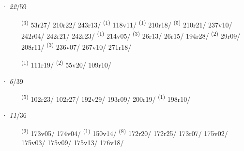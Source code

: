 \noindent{} · \textit{22}/59 \LEMMALINE
\begin{description}
    \item[]  \textsuperscript{(3)} \mbox{53r27/} \mbox{210r22/} \mbox{243r13/} \textsuperscript{(1)} \mbox{118v11/} \textsuperscript{(1)} \mbox{210r18/} \textsuperscript{(5)} \mbox{210r21/} \mbox{237v10/} \mbox{242r04/} \mbox{242r21/} \mbox{242r23/} \textsuperscript{(1)} \mbox{214v05/} \CASEBREAK {} \textsuperscript{(3)} \mbox{26r13/} \mbox{26r15/} \mbox{194r28/} \textsuperscript{(2)} \mbox{29r09/} \mbox{208r11/} \textsuperscript{(3)} \mbox{236v07/} \mbox{267v10/} \mbox{271r18/}
    \item[]  \textsuperscript{(1)} \mbox{111r19/} \CASEBREAK {} \textsuperscript{(2)} \mbox{55v20/} \mbox{109r10/}
\end{description}
\ENTRYEND
\noindent{} · \textit{6}/39 \LEMMALINE
\begin{description}
    \item[]  \textsuperscript{(5)} \mbox{102r23/} \mbox{102r27/} \mbox{192v29/} \mbox{193r09/} \mbox{200r19/} \textsuperscript{(1)} \mbox{198r10/}
\end{description}
\ENTRYEND
\noindent{} · \textit{11}/36 \LEMMALINE
\begin{description}
    \item[]  \textsuperscript{(2)} \mbox{173v05/} \mbox{174v04/} \CASEBREAK {} \textsuperscript{(1)} \mbox{150v14/} \textsuperscript{(8)} \mbox{172r20/} \mbox{172r25/} \mbox{173r07/} \mbox{175v02/} \mbox{175v03/} \mbox{175v09/} \mbox{175v13/} \mbox{176v18/}
\end{description}

